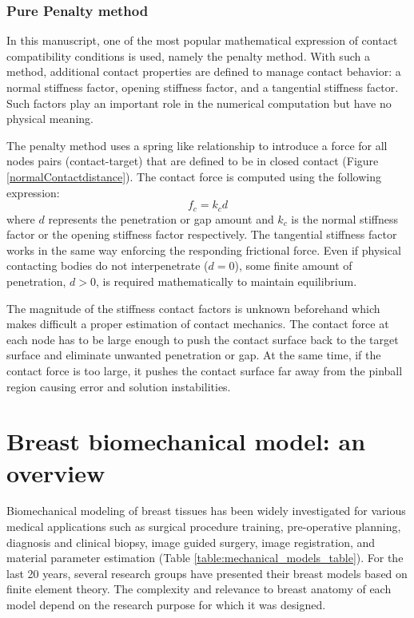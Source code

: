 \subsubsection*{Pure Penalty method}
In this manuscript, one of the most popular mathematical expression of contact compatibility conditions is used, namely the penalty method. With such a method, additional contact properties are defined to manage contact behavior: a normal stiffness factor, opening stiffness factor, and a tangential stiffness factor. Such factors play an important role in the numerical computation but have no physical meaning.

The penalty method uses a spring like relationship to introduce a force for all nodes pairs (contact-target) that are defined to be in closed contact (Figure \ref{normalContactdistance}). The contact force is computed using the following expression:
\begin{equation}
f_c = k_c d
\end{equation}
where $d$ represents the penetration or gap amount and $k_c$ is the normal stiffness factor or the opening stiffness factor respectively. The tangential stiffness factor works in the same way enforcing the responding frictional force. Even if physical contacting bodies do not interpenetrate ($d = 0$), some finite amount of penetration, $d > 0$, is required mathematically to maintain equilibrium. 
 
 The magnitude of the stiffness contact factors is unknown beforehand which makes difficult a proper estimation of contact mechanics. The contact force at each node has to be large enough to push the contact surface back to the target surface and eliminate unwanted penetration or gap. At the same time, if the contact force is too large, it pushes the contact surface far away from the pinball region causing error and solution instabilities.

\section{Breast biomechanical model: an overview}

Biomechanical modeling of breast tissues has been widely investigated for various medical applications such as surgical procedure training, pre-operative planning, diagnosis and clinical biopsy, image guided surgery, image registration, and material parameter estimation (Table \ref{table:mechanical_models_table}). For the last 20 years, several research groups have presented their breast models based on finite element theory.  The complexity and relevance to breast anatomy of each model depend on the research purpose for which it was designed. 

